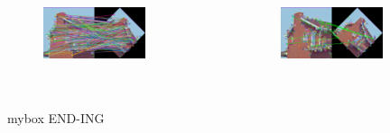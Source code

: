 \documentclass[presentation,aspectratio=1610]{beamer}
\begin{document}
\begin{frame}
\begin{columns}
		
		\begin{figure}[htbp!]
			\centering
			\includegraphics[width=0.7\textwidth]{surf/match1.png}
		\end{figure}
		
		\begin{figure}[htbp!]
			\centering
			\includegraphics[width=0.7\textwidth]{surf/match2.png}
		\end{figure}
		
	\end{columns}
	
\end{frame}


\section*{}
\begin{frame}
\frametitle{\textbf{}}
\begin{beamercolorbox}[wd=1.0\textwidth, rounded=true, shadow=true]{mybox}
	\Huge \centering \color{covblue} END-ING
\end{beamercolorbox}
\end{frame}
\end{document}
